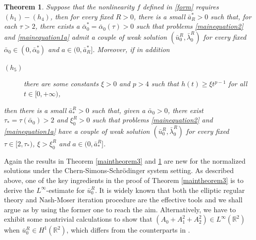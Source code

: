 \documentclass[11pt]{amsart}
\numberwithin{equation}{section}
\newtheorem{theorem}{Theorem}[section]
\theoremstyle{definition}
\newcommand{\R}{\mathbb{R}}
\begin{document}
 \begin{theorem}\label{maintheorem4}
 Suppose that the nonlinearity $f$ defined in \eqref{form}
requires $(h_1)-(h_4)$, then for every fixed $R>0$,
there is a small $\bar{a}^*_R>0$ such that,
for each $\tau>2$, there exists a $\bar{\alpha}^*_0=\bar{\alpha}_0(\tau)>0$ such that
problems \eqref{mainequation2} and \eqref{mainequation1a}  admit a couple of weak solution
$(\bar{u}_0^R,\bar{\lambda}_0^R)$ for every fixed $\bar{\alpha}_0 \in (0, \bar{\alpha}_0^*)$ and $a\in(0,\bar{a}^*_R]$.
Moreover, if in addition
\begin{description}
 \item[$(h_5)$] there are some constants $\xi>0$ and $p>4$ such that $h(t)\geq \xi t^{p-1}$ for all $t\in[0,+\infty)$,
\end{description}
then there is a small $\bar{a}_*^R>0$ such that,
given a
$\bar{\alpha}_0>0$, there exist $\tau_*=\tau(\bar{\alpha}_0)>2$ and ${\xi}_0^R>0$
such that problems \eqref{mainequation2} and \eqref{mainequation1a} have a couple of weak solution $(\bar{u}_0^R,\bar{\lambda}_0^R)$
 for every fixed $\tau \in [2,\tau_*)$,
  ${\xi}>{\xi}_0^R$ and $a\in(0,\bar{a}_*^R]$.
\end{theorem}


Again the results in Theorem \ref{maintheorem3} and \ref{maintheorem4} are new for the normalized solutions under the
Chern-Simons-Schr\"{o}dinger system setting. As described above, one of the key ingredients in the proof of Theorem \ref{maintheorem3}
is to derive the $L^\infty$-estimate for $\bar{u}_0^R$. It is widely known that
both the elliptic regular theory and Nash-Moser iteration procedure are the effective tools
and we shall argue as \cite{Shen2} by using the former one to reach the aim.
Alternatively, we have to exhibit some nontrivial calculations to show that
$(A_0+A_1^2+A_2^2)\in L^\infty(\R^2)$ when $\bar{u}_0^R\in H^1(\R^2)$, which differs from
the counterparts in \cite{Shen2}.
\end{document}
